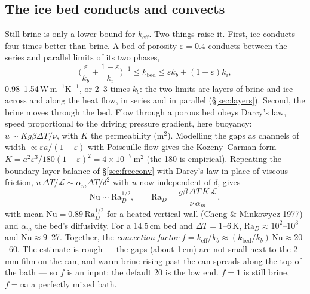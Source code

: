 \documentclass[11pt,a4paper]{article}
\begin{document}
\subsection{The ice bed conducts and convects}
\label{sec:convfactor}
Still brine is only a lower bound for $k_{\text{eff}}$. Two things raise it. First, ice conducts four
times better than brine. A bed of porosity $\varepsilon = 0.4$ conducts between the series and
parallel limits of its two phases,
\begin{equation}
\Big(\frac{\varepsilon}{k_b} + \frac{1-\varepsilon}{k_i}\Big)^{-1} \le k_{\text{bed}} \le \varepsilon k_b + (1-\varepsilon)k_i,
\label{eq:bedk}
\end{equation}
0.98–1.54\,W\,m$^{-1}$K$^{-1}$, or 2–3 times $k_b$: the two limits are layers of brine and ice across and
along the heat flow, in series and in parallel (§\ref{sec:layers}). Second, the brine moves through the bed. Flow through a porous bed obeys
Darcy's law, speed proportional to the driving pressure gradient, here buoyancy:
$u \sim K g\beta\Delta T/\nu$, with $K$ the permeability (m$^2$). Modelling the gaps as channels of
width $\propto \varepsilon a/(1-\varepsilon)$ with Poiseuille flow gives the Kozeny–Carman form
$K = a^2\varepsilon^3/180(1-\varepsilon)^2 = 4\times10^{-7}$\,m$^2$ (the 180 is empirical). Repeating the
boundary-layer balance of §\ref{sec:freeconv} with Darcy's law in place of viscous friction,
$u\,\Delta T/\mathcal L \sim \alpha_m\Delta T/\delta^2$ with $u$ now independent of $\delta$, gives
\begin{equation}
\mathrm{Nu} \sim \mathrm{Ra}_D^{1/2},\qquad \mathrm{Ra}_D = \frac{g\beta\,\Delta T\,K\,\mathcal L}{\nu\,\alpha_m},
\label{eq:darcy}
\end{equation}
with mean $\mathrm{Nu} = 0.89\,\mathrm{Ra}_D^{1/2}$ for a heated vertical wall (Cheng \& Minkowycz 1977)
and $\alpha_m$ the bed's diffusivity. For a 14.5\,cm bed and $\Delta T = 1$–6\,K, $\mathrm{Ra}_D \approx
10^2$–$10^3$ and $\mathrm{Nu} \approx 9$–27. Together, the \emph{convection factor}
$f = k_{\text{eff}}/k_b \approx (k_{\text{bed}}/k_b)\,\mathrm{Nu} \approx 20$–60. The estimate is rough —
the gaps (about 1\,cm) are not small next to the 2\,mm film on the can, and warm brine rising past the
can spreads along the top of the bath — so $f$ is an input; the default 20 is the low end. $f = 1$ is
still brine, $f = \infty$ a perfectly mixed bath.
\end{document}
